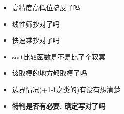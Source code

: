 \noindent
\begin{itemize}
    \item 高精度高低位搞反了吗
    \item 线性筛抄对了吗
    \item 快速乘抄对了吗
    \item sort比较函数是不是比了个寂寞
    \item 该取模的地方都取模了吗
    \item 边界情况(+1-1之类的)有没有想清楚
    \item \bfseries{特判是否有必要, 确定写对了吗}
\end{itemize}